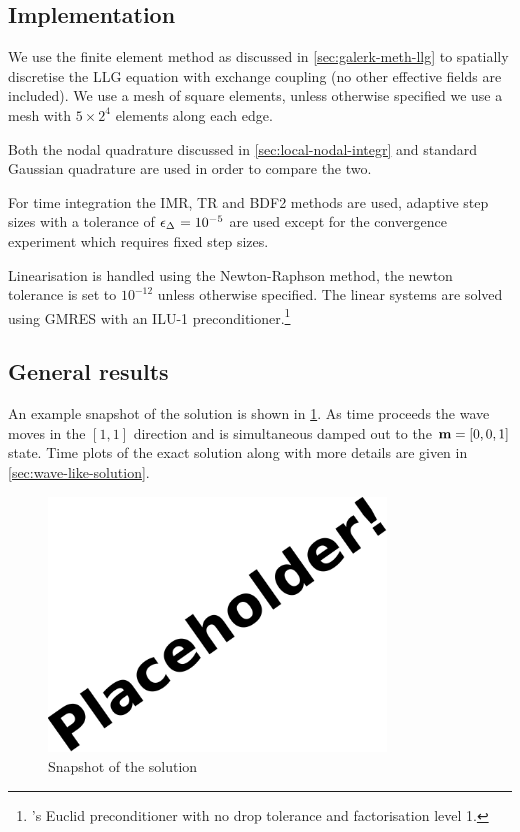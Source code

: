\subsection{Implementation}

We use the finite element method as discussed in \cref{sec:galerk-meth-llg} to spatially discretise the LLG equation with exchange coupling (no other effective fields are included).
We use a mesh of square elements, %
unless otherwise specified we use a mesh with $5 \times 2^4$ elements along each edge.

Both the nodal quadrature discussed in \cref{sec:local-nodal-integr} and standard Gaussian quadrature are used in order to compare the two.

For time integration the IMR, TR and BDF2 methods are used, adaptive step sizes with a tolerance of $\epsilon_{\Delta_{}} = 10^{-5}$ are used except for the convergence experiment which requires fixed step sizes.

Linearisation is handled using the Newton-Raphson method, the newton tolerance is set to $10^{-12}$ unless otherwise specified.
The linear systems are solved using GMRES with an ILU-1 preconditioner.\footnote{\hypre's Euclid preconditioner \cite{hypre} with no drop tolerance and factorisation level 1.}


\subsection{General results}


An example snapshot of the solution is shown in \cref{fig:2d-wave-snapshot}.
As time proceeds the wave moves in the $[1,1]$ direction and is simultaneous damped out to the $\boldsymbol{\mathrm{m}} = [0,0,1]$ state.
Time plots of the exact solution along with more details are given in \cref{sec:wave-like-solution}.

\begin{figure}
  \centering
  \includegraphics[width=0.8\textwidth]{images/placeholder}
  \caption{Snapshot of the solution}
  \label{fig:2d-wave-snapshot}
\end{figure}


